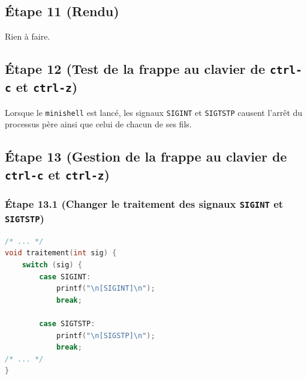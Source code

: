 \documentclass{article}
\begin{document}
\subsection*{Étape 11 (Rendu)}

Rien à faire.

\subsection*{Étape 12 (Test de la frappe au clavier de \texttt{ctrl-c} et \texttt{ctrl-z})}

Lorsque le \texttt{minishell} est lancé, les signaux \texttt{SIGINT} et \texttt{SIGTSTP} causent l'arrêt du processus père ainsi que celui de chacun de ses fils.

\subsection*{Étape 13 (Gestion de la frappe au clavier de \texttt{ctrl-c} et \texttt{ctrl-z})}

\subsubsection*{Étape 13.1 (Changer le traitement des signaux \texttt{SIGINT} et \texttt{SIGTSTP})}

\begin{lstlisting}[language=C, caption=ajout de la question 13.1]
/* ... */
void traitement(int sig) {
    switch (sig) {
        case SIGINT:
            printf("\n[SIGINT]\n");
            break;

        case SIGTSTP:
            printf("\n[SIGSTP]\n");
            break;
/* ... */
}
\end{lstlisting}
\end{document}
